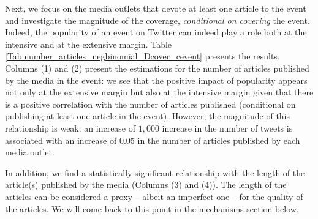 Next, we focus on the media outlets that devote at least one article to the event and investigate the magnitude of the coverage, \textit{conditional on covering} the event. Indeed, the popularity of an event on Twitter can indeed play a role both at the intensive and at the extensive margin. Table \ref{Tab:number_articles_negbinomial_Dcover_cevent} presents the results. Columns (1) and (2) present the estimations for the number of articles published by the media in the event: we see that the positive impact of popularity appears not only at the extensive margin but also at the intensive margin given that there is a positive correlation with the number of articles published (conditional on publishing at least one article in the event). However, the magnitude of this relationship is weak: an increase of $1,000$ increase in the number of tweets is associated with an increase of $0.05$ in the number of articles published by each media outlet.

In addition, we find a statistically significant relationship with the length of the article(s) published by the media (Columns (3) and (4)). The length of the articles can be considered a proxy -- albeit an imperfect one -- for the quality of the articles. We will come back to this point in the mechanisms section below.


